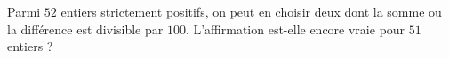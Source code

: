 Parmi $52$ entiers strictement positifs, on peut en choisir deux dont la somme ou la différence est divisible par $100$. L'affirmation est-elle encore vraie pour $51$ entiers ?
